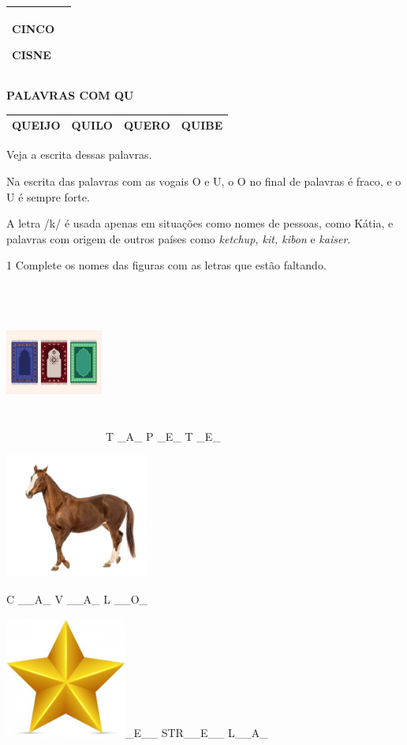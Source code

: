 {\begin{longtable}[]{@{}ll@{}}
\begin{minipage}[t]{0.48\columnwidth}
\textbf{CINCO}

\textbf{CISNE}\strut
\end{minipage}\tabularnewline
\bottomrule
\end{longtable}

\textbf{PALAVRAS COM QU}

\begin{longtable}[]{@{}llll@{}}
\toprule
\textbf{QUEIJO} & \textbf{QUILO} & \textbf{QUERO} &
\textbf{QUIBE}\tabularnewline
\bottomrule
\end{longtable}

Veja a escrita dessas palavras.

Na escrita das palavras com as vogais O e U, o O no final de palavras é
fraco, e o U é sempre forte.

A letra /k/ é usada apenas em situações como nomes de
pessoas, como Kátia, e palavras com origem de outros países como
\textit{ketchup, kit, kibon} e \textit{kaiser}.


\num{1} Complete os nomes das figuras com as letras que estão faltando.

\includegraphics[width=1.26518in,height=2.06178in]{media/image1.jpeg} T
\_A\_ P \_E\_ T \_E\_

\includegraphics[width=1.85417in,height=1.60240in]{media/image2.jpeg}

C \_\_A\_ V \_\_A\_ L \_\_O\_

\includegraphics[width=1.57292in,height=1.57292in]{media/image3.jpeg}\_E\_\_
STR\_\_E\_\_ L\_\_A\_

}
